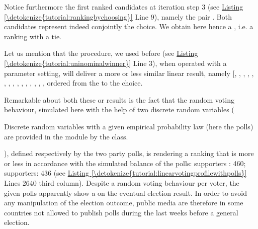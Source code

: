 \documentclass[a4paper,12pt,english]{sphinxhowto}
\begin{document}
Notice furthermore the first ranked candidates at iteration step 3 (see \hyperref[\detokenize{tutorial:rankingbychoosing}]{Listing \ref{\detokenize{tutorial:rankingbychoosing}}} Line 9), namely the pair \sphinxstyleemphasis{{[}a07, a08{]}}. Both candidates represent indeed conjointly the  choice. We obtain here hence a , i.e. a ranking with a tie.

Let us mention that the  procedure, we used before (see \hyperref[\detokenize{tutorial:uninominalwinner}]{Listing \ref{\detokenize{tutorial:uninominalwinner}}} Line 3), when operated with a  parameter setting, will deliver a more or less similar  linear  result, namely {[}, , , , , , , , , , , , , , \sphinxstyleemphasis{a06}{]}, ordered from the  to the  choice.

Remarkable about both these  or  results is the fact that the random voting behaviour, simulated here with the help of two discrete random variables (%
\begin{footnote}[16]\sphinxAtStartFootnote
Discrete random variables with a given empirical probability law (here the polls) are provided in the  module by the  class.
%
\end{footnote}), defined respectively by the two party polls, is rendering a ranking that is more or less in accordance with the simulated balance of the polls: \sphinxhyphen{} supporters : 460;   supporters: 436 (see \hyperref[\detokenize{tutorial:linearvotingprofilewithpolls}]{Listing \ref{\detokenize{tutorial:linearvotingprofilewithpolls}}} Lines 26\sphinxhyphen{}40 third column). Despite a random voting behaviour per voter, the given polls apparently show a  on the eventual election result. In order to avoid any manipulation of the election outcome, public media are therefore in some countries not allowed to publish polls during the last weeks before a general election.
\end{document}
